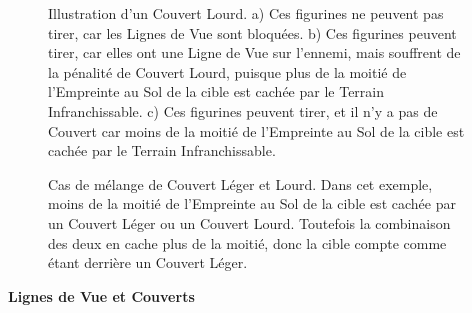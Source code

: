 \newcommand{\figureHCImpassableTerrain}{\normalfontsize{Terrain Infranchissable}}

\begin{figure}[!htbp]
\centering
\def\svgwidth{\textwidth}

\caption{Illustration d'un Couvert Lourd.\vspace*{10pt}\newline
a) Ces figurines ne peuvent pas tirer, car les Lignes de Vue sont bloquées.\vspace*{10pt}\newline
b) Ces figurines peuvent tirer, car elles ont une Ligne de Vue sur l'ennemi, mais souffrent de la pénalité de Couvert Lourd, puisque plus de la moitié de l'Empreinte au Sol de la cible est cachée par le Terrain Infranchissable.\vspace*{10pt}\newline
c) Ces figurines peuvent tirer, et il n'y a pas de Couvert car moins de la moitié de l'Empreinte au Sol de la cible est cachée par le Terrain Infranchissable.}
\label{figure/hard_cover}
\end{figure}

\newcommand{\figureSHCHill}{Colline}
\newcommand{\figureSHCHeightOne}{Taille 1}
\newcommand{\figureSHCHeightTwo}{Taille 2}
\newcommand{\figureSHCLessthanhalffromhardcover}{\normalfontsize{\textit{Moins de 50 \% en Couvert Lourd}}}
\newcommand{\figureSHCLessthanhalffromsoftcover}{\normalfontsize{\textit{Moins de 50 \% en Couvert Léger}}}
\newcommand{\figureSHCMorethanhalftotal}{\normalfontsize{\textit{Plus de 50 \% en tout}}}

\begin{figure}[!htbp]
\begin{minipage}[t]{0.45\textwidth}
\def\svgwidth{\textwidth}

\end{minipage}\hfill\begin{minipage}[b]{0.52\textwidth}
\caption{Cas de mélange de Couvert Léger et Lourd.\vspace*{10pt}\newline
Dans cet exemple, moins de la moitié de l'Empreinte au Sol de la cible est cachée par un Couvert Léger ou un Couvert Lourd. Toutefois la combinaison des deux en cache plus de la moitié, donc la cible compte comme étant derrière un Couvert Léger.}
\label{figure/soft_and_hard_cover}
\end{minipage}
\end{figure}

\clearpage
\noindent\textbf{Lignes de Vue et Couverts}

